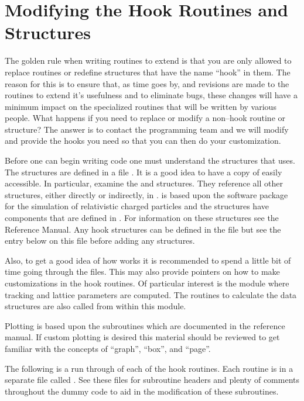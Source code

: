 \section{Modifying the Hook Routines and Structures}

The golden rule when writing routines to extend \tao is that you are
only allowed to replace routines or redefine structures that have the
name ``hook'' in them. The reason for this is to ensure that, as time
goes by, and revisions are made to the \tao routines to extend it's
usefulness and to eliminate bugs, these changes will
have a minimum impact on the specialized routines that will be written
by various people.  What happens if you need to replace
or modify a non--hook routine or structure?  The answer is to contact
the \tao programming team and we will modify \tao and provide the hooks 
you need so that you can then do your customization.

Before one can begin writing code one must understand the structures
that \tao uses. The structures are defined in a file
. It is a good idea to have a copy of
 easily accessible. In particular, examine
the  and 
structures. They reference all other structures, either directly or
indirectly, in .  \tao is based upon the \bmad software
package for the simulation of relativistic charged particles and the
\tao structures have components that are defined in \bmad. For
information on these structures see the \bmad Reference Manual. Any
hook structures can be defined in the file  but
see the entry below on this file before adding any structures.

Also, to get a good idea of how \tao works it is recommended to spend a
little bit of time going through the  files. This may also
provide pointers on how to make customizations in the hook routines. Of
particular interest is the module  where tracking
and lattice parameters are computed. The routines to calculate the data structures
are also called from within this module.

Plotting is based upon the  subroutines which are
documented in the \bmad reference manual. If custom plotting is
desired this material should be reviewed to get familiar with the
concepts of ``graph'', ``box'', and ``page''.

The following is a run through of each of the hook routines. Each
routine is in a separate file called
. See these files for subroutine
headers and plenty of comments throughout the dummy code to aid in the
modification of these subroutines.

